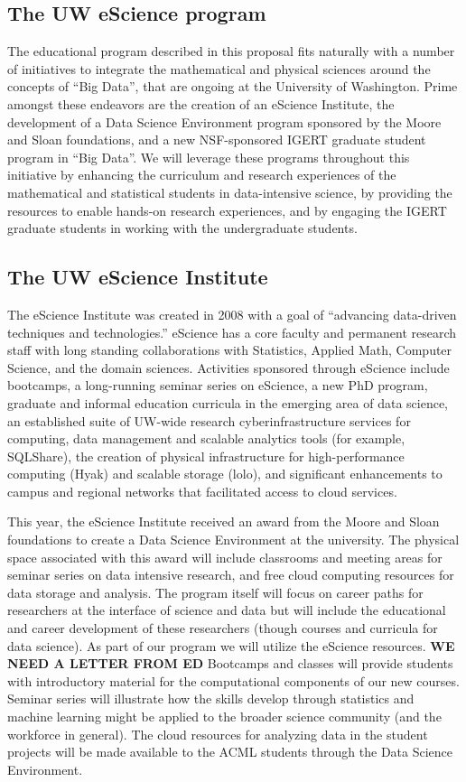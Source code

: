 \subsection{The UW eScience program}
The educational program described in this proposal fits naturally with a number of initiatives to integrate the mathematical and physical sciences around the concepts of ``Big Data'', that are ongoing at the University of Washington. Prime amongst these endeavors are the creation of an eScience Institute, the development of a Data Science Environment program sponsored by the Moore and Sloan foundations, and a new NSF-sponsored IGERT graduate student program in ``Big Data''. We will leverage these programs throughout this initiative by enhancing the curriculum and research experiences of the mathematical and statistical students in data-intensive science, by providing the resources to enable hands-on research experiences, and by engaging the IGERT graduate students in working with the undergraduate students.

\subsection{The UW eScience Institute}

The eScience Institute was created in 2008 with a goal of “advancing data-driven techniques and technologies.” eScience has a core faculty and permanent research staff with long standing collaborations with Statistics, Applied Math, Computer Science, and the domain sciences. Activities sponsored through eScience include bootcamps, a long-running seminar series on eScience, a new PhD program, graduate and informal education curricula in the emerging area of data science, an established suite of UW-wide research cyberinfrastructure services for computing, data management and scalable analytics tools (for example, SQLShare), the creation of physical infrastructure for high-performance computing (Hyak) and scalable storage (lolo), and significant enhancements to campus and regional networks that facilitated access to cloud services.

This year, the eScience Institute received an award from the Moore and Sloan foundations to create a Data Science Environment at the university. The physical space associated with this award will include classrooms and meeting areas for seminar series on data intensive research, and free cloud computing resources for data storage and analysis. The program itself will focus on career paths for researchers at the interface of science and data but will include the educational and career development of these researchers (though courses and curricula for data science). As part of our program we will utilize the eScience resources. {\bf WE NEED A LETTER FROM ED} Bootcamps and classes will provide students with introductory material for the computational components of our new courses. Seminar series will illustrate how the skills develop through statistics and machine learning might be applied to the broader science community (and the workforce in general). The cloud resources for analyzing data in the student projects will be made available to the ACML students through the Data Science Environment.

